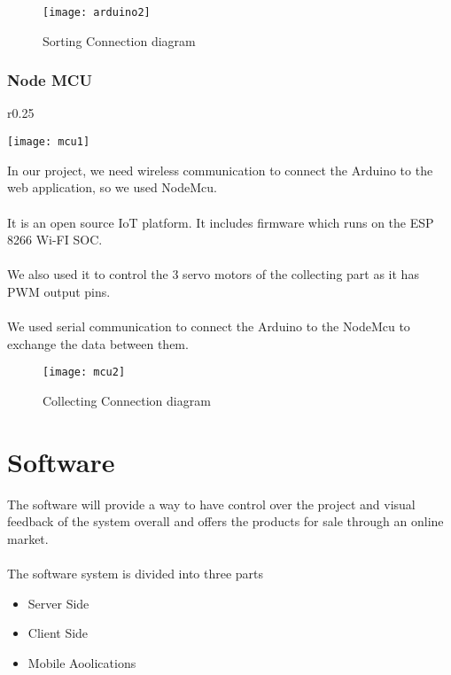   \begin{figure}[h]
    \texttt{[image: arduino2]}
    \centering
    \caption{Sorting Connection diagram}
    \label{fig:arduino2}
\end{figure}

\subsection{Node MCU}

\begin{wrapfigure}{r}{0.25\textwidth}
    \begin{center}
      \texttt{[image: mcu1]}
    \end{center}
  \end{wrapfigure}

  In our project, we need wireless communication to connect the Arduino
to the web application, so we used NodeMcu.\\\\
It is an open source IoT platform. It includes firmware which runs on
the ESP 8266 Wi-FI SOC.\\\\
We also used it to control the 3 servo motors of the collecting part as it
has PWM output pins.\\\\
We used serial communication to connect the Arduino to the NodeMcu
to exchange the data between them.\\

\begin{figure}[h]
    \texttt{[image: mcu2]}
    \centering
    \caption{Collecting Connection diagram}
    \label{fig:arduino2}
\end{figure}


\chapter{Software}

The software will provide a way to have control over the project and visual feedback of the system
overall and offers the products for sale through an online market.\\\\
The software system is divided into three parts
\begin{itemize}
    \item Server Side
    \item Client Side
    \item Mobile Aoolications
\end{itemize}

